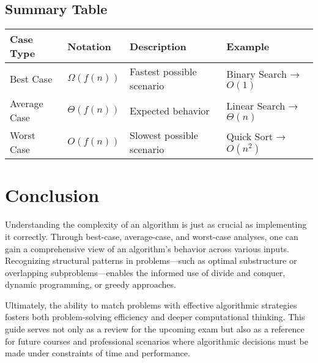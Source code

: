 \documentclass[12pt]{article}
\begin{document}
\subsection{Summary Table}

\begin{center}
    \begin{tabular}{@{}llll@{}}
        \toprule
        \textbf{Case Type} & \textbf{Notation} & \textbf{Description} & \textbf{Example} \\ \midrule
        Best Case   & \( \Omega(f(n)) \) & Fastest possible scenario & Binary Search → \( O(1) \) \\
        Average Case& \( \Theta(f(n)) \) & Expected behavior          & Linear Search → \( \Theta(n) \) \\
        Worst Case  & \( O(f(n)) \)      & Slowest possible scenario  & Quick Sort → \( O(n^2) \) \\
        \bottomrule
    \end{tabular}
\end{center}


\section*{Conclusion}
Understanding the complexity of an algorithm is just as crucial as implementing it correctly. Through best-case, average-case, and worst-case analyses, one can gain a comprehensive view of an algorithm’s behavior across various inputs. Recognizing structural patterns in problems—such as optimal substructure or overlapping subproblems—enables the informed use of divide and conquer, dynamic programming, or greedy approaches.

Ultimately, the ability to match problems with effective algorithmic strategies fosters both problem-solving efficiency and deeper computational thinking. This guide serves not only as a review for the upcoming exam but also as a reference for future courses and professional scenarios where algorithmic decisions must be made under constraints of time and performance.

\end{document}
